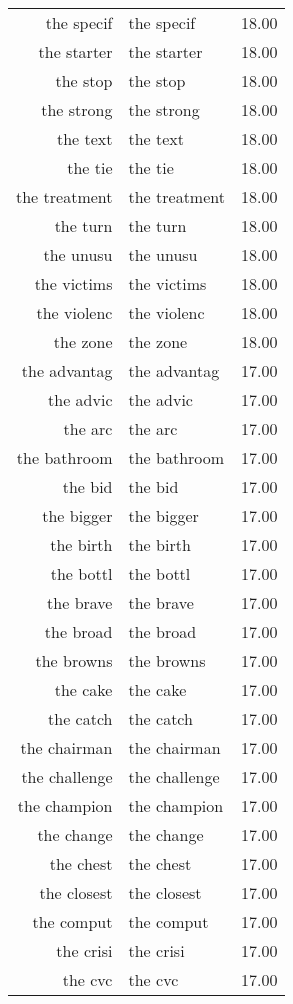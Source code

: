 \begin{table}[ht]
\begin{tabular}{rlr}
  the specif & the specif & 18.00 \\ 
  the starter & the starter & 18.00 \\ 
  the stop & the stop & 18.00 \\ 
  the strong & the strong & 18.00 \\ 
  the text & the text & 18.00 \\ 
  the tie & the tie & 18.00 \\ 
  the treatment & the treatment & 18.00 \\ 
  the turn & the turn & 18.00 \\ 
  the unusu & the unusu & 18.00 \\ 
  the victims & the victims & 18.00 \\ 
  the violenc & the violenc & 18.00 \\ 
  the zone & the zone & 18.00 \\ 
  the advantag & the advantag & 17.00 \\ 
  the advic & the advic & 17.00 \\ 
  the arc & the arc & 17.00 \\ 
  the bathroom & the bathroom & 17.00 \\ 
  the bid & the bid & 17.00 \\ 
  the bigger & the bigger & 17.00 \\ 
  the birth & the birth & 17.00 \\ 
  the bottl & the bottl & 17.00 \\ 
  the brave & the brave & 17.00 \\ 
  the broad & the broad & 17.00 \\ 
  the browns & the browns & 17.00 \\ 
  the cake & the cake & 17.00 \\ 
  the catch & the catch & 17.00 \\ 
  the chairman & the chairman & 17.00 \\ 
  the challenge & the challenge & 17.00 \\ 
  the champion & the champion & 17.00 \\ 
  the change & the change & 17.00 \\ 
  the chest & the chest & 17.00 \\ 
  the closest & the closest & 17.00 \\ 
  the comput & the comput & 17.00 \\ 
  the crisi & the crisi & 17.00 \\ 
  the cvc & the cvc & 17.00 \\ 

\end{tabular}
\end{table}
